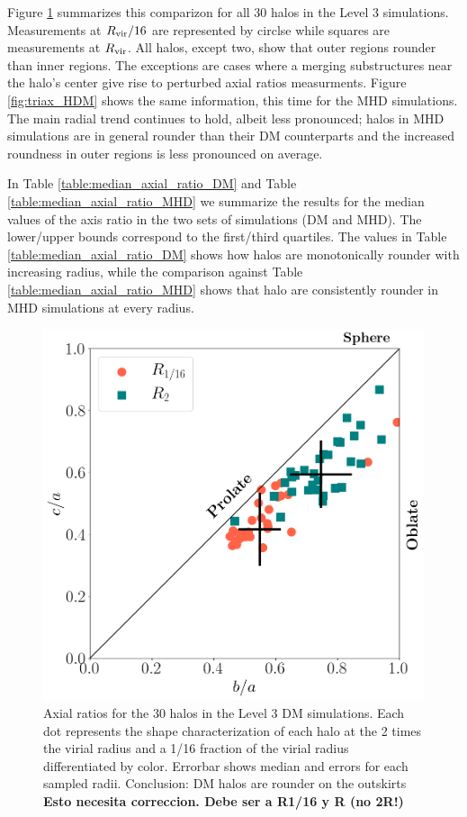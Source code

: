 \documentclass[a4paper,fleqn,usenatbib]{mnras}
\begin{document}
Figure \ref{fig:triax_DM} summarizes this comparizon for all 30 halos
in the Level 3 simulations. 
Measurements at $R_{\rm vir}/16$ are represented by circlse while squares 
are measurements at $R_{\rm vir}$. 
All halos, except two, show that outer regions rounder than inner
regions.
The exceptions are cases where a merging substructures near  the
halo's center give rise to perturbed axial ratios measurments. 
Figure \ref{fig:triax_HDM} shows the same information, this time for
the MHD simulations. 
The main radial trend continues to hold, albeit less pronounced; halos
in MHD simulations are in general rounder than their DM counterparts
and the increased roundness in outer regions is less pronounced on
average.

In Table \ref{table:median_axial_ratio_DM} and Table \ref{table:median_axial_ratio_MHD}
we summarize the results for the median values of the axis ratio in
the two sets of simulations (DM and MHD). 
The lower/upper bounds correspond to the first/third quartiles. 
The values in Table  \ref{table:median_axial_ratio_DM} shows how halos are
monotonically rounder with increasing radius, while the comparison
against Table \ref{table:median_axial_ratio_MHD} shows that halo are
consistently rounder in MHD simulations at every radius.

 
\begin{figure}
\includegraphics[width=0.9\columnwidth]{./pics/Triaxial_Plane/Triax_DM.png}
\caption{Axial ratios for the 30 halos in the Level 3 DM simulations.
   Each dot represents the shape characterization of each halo at the 2 times the virial radius and a  1/16 fraction of the virial radius differentiated by color.
  Errorbar shows median and errors for each sampled radii.
  Conclusion: DM halos are rounder on the outskirts {\bf Esto necesita
  correccion. Debe ser a R1/16 y R (no 2R!)}}
  \label{fig:triax_DM}
\end{figure}
\end{document}
